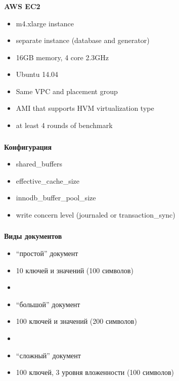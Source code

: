 \documentclass[usenames,dvipsnames, 18pt, compress, aspectratio=169]{beamer}
\begin{document}
\begin{frame}
    \frametitle{}
    \begin{center}
        \textbf{AWS EC2}
        \begin{itemize}[label={}]
            \item m4.xlarge instance
            \item separate instance (database and generator)
            \item 16GB memory, 4 core 2.3GHz
            \item Ubuntu 14.04
            \item Same VPC and placement group
            \item AMI that supports HVM virtualization type
            \item at least 4 rounds of benchmark
        \end{itemize}
    \end{center}
\end{frame}

\begin{frame}
    \frametitle{}
    \begin{center}
        \textbf{Конфигурация}
        \begin{itemize}[label={}]
            \item shared\_buffers
            \item effective\_cache\_size
            \item innodb\_buffer\_pool\_size
            \item write concern level (journaled or transaction\_sync)
        \end{itemize}
    \end{center}
\end{frame}

\begin{frame}
    \frametitle{}
    \begin{center}
        \textbf{Виды документов}
        \begin{itemize}[label={}]
            \item “простой” документ
            \item 10 ключей и значений (100 символов)
            \item
            \item “большой” документ
            \item 100 ключей и значений (200 символов)
            \item
            \item “сложный” документ
            \item 100 ключей, 3 уровня вложенности (100 символов)
        \end{itemize}
    \end{center}
\end{frame}
\end{document}

